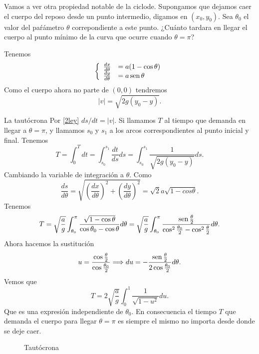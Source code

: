   \begin{ejemplo}[La tautócrona]


  \end{ejemplo}




  Vamos a ver otra propiedad notable de la ciclode. Supongamos que dejamos caer el cuerpo del reposo desde un punto intermedio, digamos en $(x_0,y_0)$. Sea  $\theta_0$
 el valor del paŕámetro $\theta$ correpondiente a este punto. ¿Cuánto tardara en llegar el cuerpo al punto mínimo de la curva que ocurre cuando $\theta=\pi$? 


  
  

 Tenemos
\[
 \left\{ \begin{array}{l l}
 \frac{dx}{d\theta}&=a(1-\cos\theta)\\
 \frac{dy}{d\theta}&=a\sen\theta 
 \end{array}\right.
\]
% 
Como el cuerpo ahora no parte de $(0,0)$ tendremos
\[|v|=\sqrt{2g(y_0-y)}.\]


  
  {La tautócrona}
Por \eqref{2ley} $ds/dt=|v|$. Si llamamos $T$ al tiempo que demanda en llegar a $\theta=\pi$, y llamamos  $s_0$ y $s_1$ a los arcos correspondientes al punto inicial
y final.  Tenemos
 \[T=\int_0^Tdt=\int_{s_0}^{s_1}\frac{dt}{ds}ds=\int_{s_0}^{s_1}\frac{1}{\sqrt{2g(y_0-y)}}ds.\]
Cambiando la variable de integración a $\theta$. Como 
\[
 \frac{ds}{d\theta}=\sqrt{\left(\frac{dx}{d\theta}\right)^2+\left(\frac{dy}{d\theta}\right)^2}=\sqrt{2}a\sqrt{1-cos\theta}.
\]
 Tenemos
\[T=\sqrt{\frac{a}{g}}\int_{\theta_0}^{\pi}\frac{\sqrt{1-\cos\theta}}{\cos\theta_0-\cos\theta}d\theta=
\sqrt{\frac{a}{g}}\int_{\theta_0}^{\pi}\frac{\sen\frac{\theta}{2}}{\cos^2\frac{\theta_0}{2}-\cos^2\frac{\theta}{2}}d\theta.
\]
Ahora hacemos la sustitución
\[u=\frac{\cos\frac{\theta}{2}}{\cos\frac{\theta_0}{2}}\Longrightarrow du=-\frac{\sen\frac{\theta}{2}}{2\cos\frac{\theta_0}{2}}d\theta.\]
Vemos que
\[
 T=2\sqrt{\frac{a}{g}}\int_0^1\frac{1}{\sqrt{1-u^2}}du.
\]
Que es una expresión independiente de $\theta_0$. En consecuencia el tiempo $T$ que demanda  el cuerpo para llegar $\theta=\pi$ es siempre el mismo no importa
desde donde se deje caer.

\begin{figure}[h]
\begin{center}
\end{center}\caption{Tautócrona}\label{fig:tautocrona}
\end{figure}


  
  
%